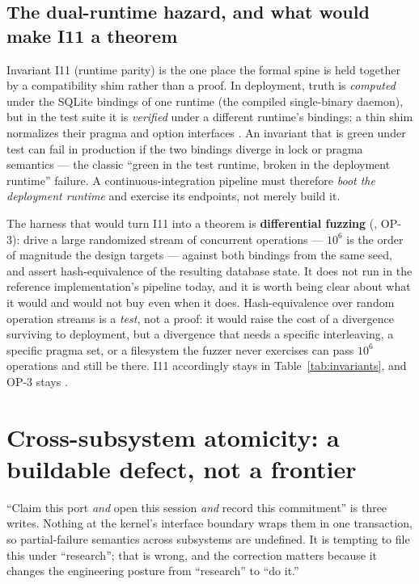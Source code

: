 \documentclass[11pt,a4paper]{article}
\theoremstyle{definition}
\theoremstyle{remark}
\begin{document}
\subsection{The dual-runtime hazard, and what would make I11 a theorem}

Invariant I11 (runtime parity) is the one place the formal spine is held together
by a compatibility shim rather than a proof. In deployment, truth is \emph{computed}
under the SQLite bindings of one runtime (the compiled single-binary daemon), but in
the test suite it is \emph{verified} under a different runtime's bindings; a thin
shim normalizes their pragma and option interfaces
. An invariant that is green under test can fail
in production if the two bindings diverge in lock or pragma semantics --- the
classic ``green in the test runtime, broken in the deployment runtime'' failure. A
continuous-integration pipeline must therefore \emph{boot the deployment runtime}
and exercise its endpoints, not merely build it.

The harness that would turn I11 into a theorem is \textbf{differential fuzzing}
(\Designed, OP-3): drive a large randomized stream of concurrent operations ---
$10^6$ is the order of magnitude the design targets --- against both bindings from
the same seed, and assert hash-equivalence of the resulting database state. It does
not run in the reference implementation's pipeline today, and it is worth being
clear about what it would and would not buy even when it does. Hash-equivalence over
random operation streams is a \emph{test}, not a proof: it would raise the cost of a
divergence surviving to deployment, but a divergence that needs a specific
interleaving, a specific pragma set, or a filesystem the fuzzer never exercises can
pass $10^6$ operations and still be there. I11 accordingly stays \BuiltWeak{} in
Table~\ref{tab:invariants}, and OP-3 stays \Open{}.

\pdexercisepointer{\ref{ex:swk-linearizability-assumptions}}{\ref{ex:swk-op3-differential}}{\pageref{ex:swk-linearizability-assumptions}}

\section{Cross-subsystem atomicity: a buildable defect, not a frontier}
\label{sec:atomicity}

``Claim this port \emph{and} open this session \emph{and} record this commitment''
is three writes. Nothing at the kernel's interface boundary wraps them in one
transaction, so partial-failure semantics across subsystems are undefined. It is
tempting to file this under ``research''; that is wrong, and the correction matters
because it changes the engineering posture from ``research'' to ``do it.''
\end{document}
